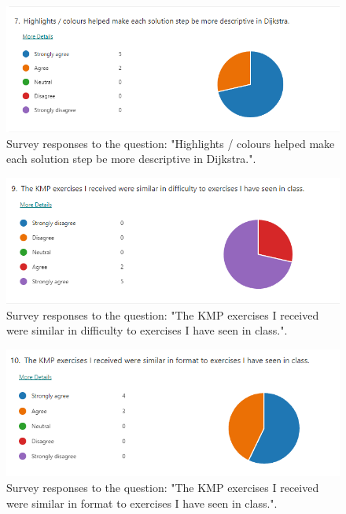\documentclass{l4proj}
\begin{document}
\begin{appendices}
\begin{figure}[h]
    \centering
    \includegraphics[width=0.9\linewidth]{images/d_highlights.png}    

    \caption{Survey responses to the question: "Highlights / colours helped make each solution step be more descriptive in Dijkstra.".}
    \label{fig:d_highlights} 
\end{figure}

\begin{figure}[h]
    \centering
    \includegraphics[width=0.9\linewidth]{images/k_similar_difficulty.png}    

    \caption{Survey responses to the question: "The KMP exercises I received were similar in difficulty to exercises I have seen in class.".}
    \label{fig:k_similar_difficulty} 
\end{figure}

\begin{figure}[h]
    \centering
    \includegraphics[width=0.9\linewidth]{images/k_similar_format.png}    

    \caption{Survey responses to the question: "The KMP exercises I received were similar in format to exercises I have seen in class.".}
    \label{fig:k_similar_format} 
\end{figure}


\end{appendices}
\end{document}
